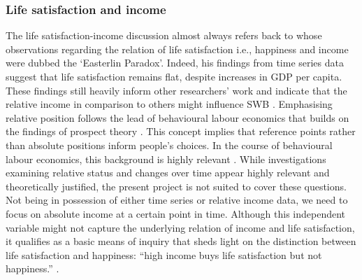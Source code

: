 \documentclass[preprint,12pt,authoryear]{elsarticle}
\begin{document}
\subsubsection{Life satisfaction and income}
The life satisfaction-income discussion almost always refers back to \citet{easterlin_does_1974} whose observations regarding
the relation of life satisfaction i.e., happiness and income were dubbed the `Easterlin Paradox'. Indeed, his findings from time series data
suggest that life satisfaction remains flat, despite increases in GDP per capita. These findings still heavily inform other researchers'
work and indicate that the relative income in comparison to others might influence SWB \citep{di_tella_happiness_2010,drichoutis_reference_2010,pedersen_happiness_2011}.
Emphasising relative position follows the lead of behavioural labour economics that builds on the findings of prospect theory \citep{kahneman_prospect_1979}.
This concept implies that reference points rather than absolute positions inform people's choices. In the course of behavioural
labour economics, this background is highly relevant \citep{dohmen_behavioral_2014}. 
While investigations examining relative status and changes over time appear highly relevant and theoretically justified, the present
project is not suited to cover these questions. Not being in possession of either time series or relative income data, we need
to focus on absolute income at a certain point in time. Although this independent variable might not capture the underlying relation
of income and life satisfaction, it qualifies as a basic means of inquiry that sheds light on the distinction between life satisfaction
and happiness: “high income buys life satisfaction but not happiness.” \citep[p. 16489]{kahneman_high_2010}. 
\end{document}
